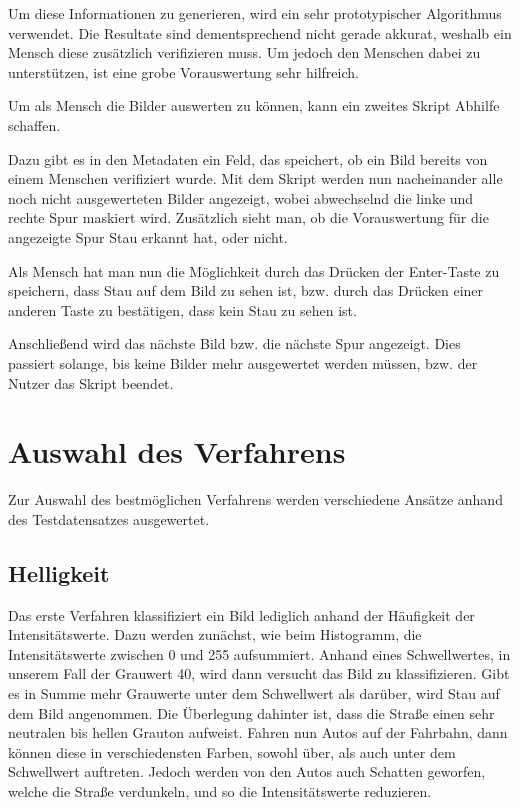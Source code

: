 Um diese Informationen zu generieren, wird ein sehr prototypischer Algorithmus verwendet. Die Resultate sind dementsprechend nicht gerade akkurat, weshalb ein Mensch diese zusätzlich verifizieren muss. Um jedoch den Menschen dabei zu unterstützen, ist eine grobe Vorauswertung sehr hilfreich.

Um als Mensch die Bilder auswerten zu können, kann ein zweites Skript Abhilfe schaffen.

Dazu gibt es in den Metadaten ein Feld, das speichert, ob ein Bild bereits von einem Menschen verifiziert wurde.
Mit dem Skript werden nun nacheinander alle noch nicht ausgewerteten Bilder angezeigt, wobei abwechselnd die linke und rechte Spur maskiert wird. Zusätzlich sieht man, ob die Vorauswertung für die angezeigte Spur Stau erkannt hat, oder nicht.

Als Mensch hat man nun die Möglichkeit durch das Drücken der Enter-Taste zu speichern, dass Stau auf dem Bild zu sehen ist, bzw. durch das Drücken einer anderen Taste zu bestätigen, dass kein Stau zu sehen ist.

Anschließend wird das nächste Bild bzw. die nächste Spur angezeigt.
Dies passiert solange, bis keine Bilder mehr ausgewertet werden müssen, bzw. der Nutzer das Skript beendet.

\section{Auswahl des Verfahrens}
Zur Auswahl des bestmöglichen Verfahrens werden verschiedene Ansätze anhand des Testdatensatzes ausgewertet.

\subsection{Helligkeit}
Das erste Verfahren klassifiziert ein Bild lediglich anhand der Häufigkeit der Intensitätswerte.
Dazu werden zunächst, wie beim Histogramm, die Intensitätswerte zwischen 0 und 255 aufsummiert.
Anhand eines Schwellwertes, in unserem Fall der Grauwert 40, wird dann versucht das Bild zu klassifizieren.
Gibt es in Summe mehr Grauwerte unter dem Schwellwert als darüber, wird Stau auf dem Bild angenommen.
Die Überlegung dahinter ist, dass die Straße einen sehr neutralen bis hellen Grauton aufweist. Fahren nun Autos auf der Fahrbahn, dann können diese in verschiedensten Farben, sowohl über, als auch unter dem Schwellwert auftreten.
Jedoch werden von den Autos auch Schatten geworfen, welche die Straße verdunkeln, und so die Intensitätswerte reduzieren.
	
